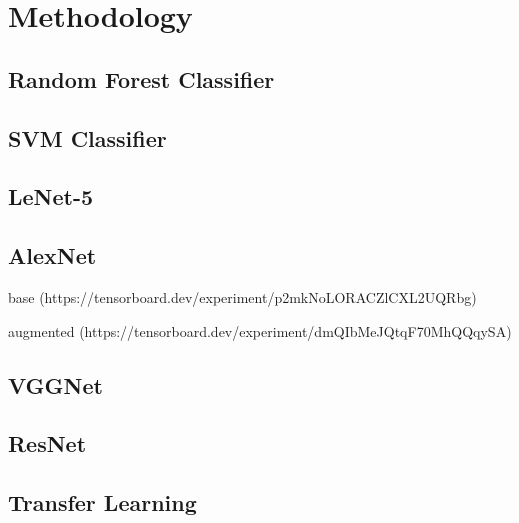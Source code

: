 \chapter{Methodology} \label{chap:benchmark}

\section{Random Forest Classifier}

\section{SVM Classifier}

\section{LeNet-5}

\section{AlexNet}
base (https://tensorboard.dev/experiment/p2mkNoLORACZlCXL2UQRbg)


augmented (https://tensorboard.dev/experiment/dmQIbMeJQtqF70MhQQqySA)

\section{VGGNet}

\section{ResNet}

\section{Transfer Learning}